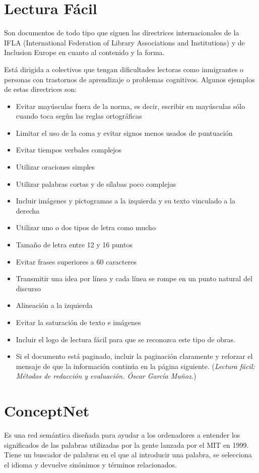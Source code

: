 \section{Lectura Fácil}

Son documentos de todo tipo que siguen las directrices internacionales de la IFLA (International Federation of Library Associations and Institutions) y de Inclusion Europe en cuanto al contenido y la forma.

Está dirigida a colectivos que tengan dificultades lectoras como inmigrantes o personas con trastornos de aprendizaje o problemas cognitivos.
Algunos ejemplos de estas directrices son:
\begin{itemize}
	\item Evitar mayúsculas fuera de la norma, es decir, escribir en mayúsculas sólo cuando toca según las reglas ortográficas
	\item Limitar el uso de la coma y evitar signos menos usados de puntuación
	\item Evitar tiempos verbales complejos
	\item Utilizar oraciones simples
	\item Utilizar palabras cortas y de sílabas poco complejas
	\item Incluir imágenes y pictogramas a la izquierda y su texto vinculado a la derecha
	\item Utilizar uno o dos tipos de letra como mucho
	\item Tamaño de letra entre 12 y 16 puntos
	\item Evitar frases superiores a 60 caracteres
	\item Transmitir una idea por línea y cada línea se rompe en un punto natural del discurso
	\item Alineación a la izquierda
	\item Evitar la saturación de texto e imágenes
	\item Incluir el logo de lectura fácil para que se reconozca este tipo de obras. 
	\item Si el documento está paginado, incluir la paginación claramente y reforzar el mensaje de que la información continúa en la página siguiente.
	(\textit {Lectura fácil: Métodos de redacción y evaluación.  Óscar García Muñoz.})	
\end{itemize}

\section{ConceptNet} 

Es una red semántica diseñada para ayudar a los ordenadores a entender los significados de las palabras utilizadas por la gente lanzada por el MIT en 1999.
Tiene un buscador de palabras en el que al introducir una palabra, se selecciona el idioma y devuelve sinónimos y términos relacionados.

